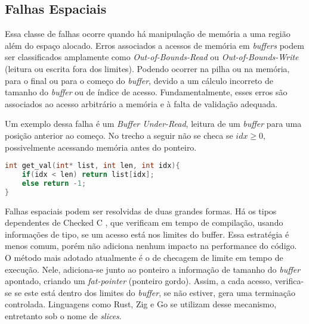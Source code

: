 
\subsection{Falhas Espaciais}
\label{sec:mem-error:spacial}

Essa classe de falhas ocorre quando há manipulação de memória a uma região 
além do espaço alocado. Erros associados a acessos de memória em \emph{buffers} 
podem ser classificados amplamente como \emph{Out-of-Bounds-Read} ou \emph{Out-of-Bounds-Write} 
(leitura ou escrita fora dos limites). 
Podendo ocorrer na pilha ou na memória, para o final ou para o começo do \emph{buffer}, 
devido a um cálculo incorreto de tamanho do \emph{buffer} ou de índice de acesso. 
Fundamentalmente, esses erros são associados ao acesso arbitrário a memória e 
à falta de validação adequada.

Um exemplo dessa falha é um \emph{Buffer Under-Read}, 
leitura de um \emph{buffer} para uma posição anterior ao começo. No trecho a seguir
não se checa se $idx \ge 0$, possivelmente acessando memória antes do ponteiro.

\begin{lstlisting}[language=C ,label={lst:spacial-error-c}, caption=Exemplo de uma Falha Espacial]
int get_val(int* list, int len, int idx){
	if(idx < len) return list[idx];
	else return -1;
}
\end{lstlisting}

Falhas espaciais podem ser resolvidas de duas grandes formas. Há os tipos dependentes de Checked C \cite{CHECKEDC}, que verificam em tempo de compilação, usando informações de tipo, se um acesso está nos limites do buffer. Essa estratégia é menos comum, porém não adiciona nenhum impacto na performance do código. 
O método mais adotado atualmente é o de checagem de limite em tempo de execução. Nele, adiciona-se junto ao ponteiro a informação de tamanho do \emph{buffer} apontado, criando um \emph{fat-pointer} (ponteiro gordo). Assim, a cada acesso, verifica-se se este está dentro dos limites do \emph{buffer}, se não estiver, gera uma terminação controlada. Linguagens como Rust, Zig e Go se utilizam desse mecanismo, entretanto sob o nome de \emph{slices}.


